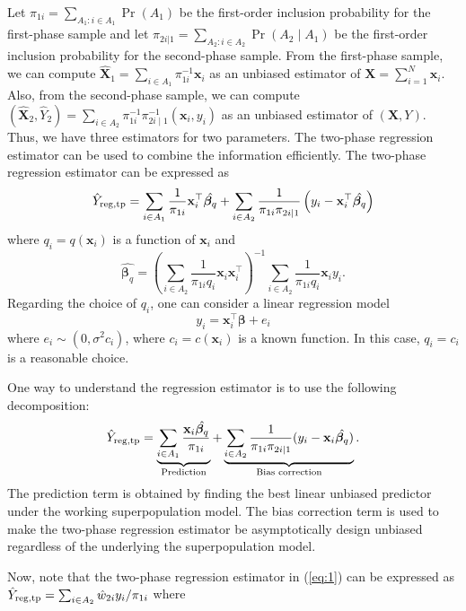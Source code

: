 \documentclass[12pt]{article}
\newcommand{\bx}{\mathbf{x}}
\renewcommand{\bf}[1]{\mathbf{#1}}
\begin{document}
Let $\pi_{1i} = \sum_{A_1: i \in A_1} \Pr(A_1)$ be the first-order inclusion probability for the first-phase sample and let $\pi_{2i | 1} = \sum_{A_2: i \in A_2} \Pr(A_2 \mid A_1)$ be the first-order inclusion probability for the second-phase sample. From the first-phase sample, we can compute $\widehat{\mathbf{X}}_1 = \sum_{i \in A_1} \pi_{1i}^{-1} \bx_i$ as an unbiased estimator of $\mathbf{X}= \sum_{i=1}^N  \bx_i$. Also, from the second-phase sample, we can compute $\left( \widehat{\mathbf{X}}_2 , \widehat{Y}_2 \right) = \sum_{i \in A_2} \pi_{1i}^{-1} \pi_{2i \mid 1}^{-1} \left( \bx_i, y_i\right)$ as an unbiased estimator of $( \mathbf{X}, Y )$. Thus, we have three estimators for two parameters. The two-phase regression estimator can be  used to combine the information efficiently.  The two-phase regression estimator can be expressed as  
\begin{equation}
\hat Y_{\rm reg, tp} 
= \sum_{i \in A_1} \frac{1}{\pi_{1i}} \bf x_i^\top  \hat{\bm \beta_q} + 
\sum_{i \in A_2} \frac{1}{\pi_{1i}\pi_{2i|1}} \left(y_i - \bf x_i^\top  \hat{\bm \beta_q}\right)
\label{eq:1}
\end{equation} 
where $q_i = q(\bf x_i)$  is a function of $\bf x_i$ and  
$$
\hat{\bm \beta_q} = \left(\sum_{i \in A_2} 
 \frac{1}{\pi_{1i} q_i } \bf x_i \bf x_i^\top \right)^{-1} 
\sum_{i \in A_2} \frac{1}{\pi_{1i} q_i} \bf x_i y_i .
$$ 
Regarding the choice of $q_i$, one can consider a linear regression model 
\begin{equation}
y_i = \bx_i^\top \bm \beta + e_i 
\end{equation}
where $e_i \sim \left(0, \sigma^2 c_i \right)$, where $c_i=c( \bx_i)$ is a known function. In this case,   $q_i=c_i$ is a reasonable choice. 


One way to understand the regression estimator is to use the following decomposition: 
$$ 
\hat Y_{\rm reg, tp} 
= \underbrace{\sum_{i \in A_1} \frac{\bf x_i \hat{\bm \beta_q}}{\pi_{1i}}}_{
  \text{ Prediction  }} + \underbrace{\sum_{i \in A_2}
\frac{1}{\pi_{1i}\pi_{2i|1}} (y_i - \bf x_i \hat{\bm \beta_q})}_{
\text{Bias correction}}.
$$
The prediction term is obtained by finding the best linear unbiased predictor under the working superpopulation model. The bias correction term is used to make  the two-phase regression estimator be asymptotically design unbiased regardless of the underlying the superpopulation model. 


Now, note that the two-phase regression estimator in (\ref{eq:1})  can be expressed as  $\hat Y_{\rm reg, tp} =
\sum_{i \in A_2} \hat w_{2i} y_i / \pi_{1i}$ where 
\end{document}
